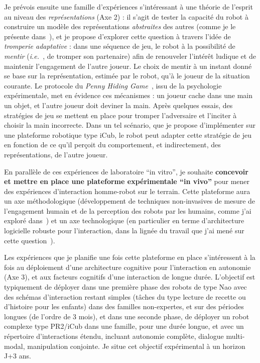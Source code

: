 \documentclass[a4paper]{article}
\newcommand{\ie}{{\textit{i.e.~}}}
\begin{document}
Je prévois ensuite une famille d'expériences s'intéressant à une théorie de
l'esprit au niveau des \emph{représentations} (Axe 2) : il s'agit de tester la
capacité du robot à construire un modèle des représentations \emph{abstraites}
des autres (comme je le présente dans~\cite{lemaignan2015mutual}), et je propose
d'explorer cette question à travers l'idée de \emph{tromperie adaptative} : dans
une séquence de jeu, le robot à la possibilité de \emph{mentir} (\ie, de tromper
son partenaire) afin de renouveler l'intérêt ludique et de maintenir
l'engagement de l'autre joueur. Le choix de mentir à un instant donné se base sur
la représentation, estimée par le robot, qu'à le joueur de la situation
courante. Le protocole du \emph{Penny Hiding Game}~\cite{oswald1989role}, issu
de la psychologie expérimentale, met en évidence ces mécanismes : un joueur
cache dans une main un objet, et l'autre joueur doit deviner la main.  Après
quelques essais, des stratégies de jeu se mettent en place pour tromper
l'adversaire et l'inciter à choisir la main incorrecte. Dans un tel scénario,
que je propose d'implémenter sur une plateforme robotique type iCub, le robot
peut adapter cette stratégie de jeu en fonction de ce qu'il perçoit du
comportement, et indirectement, des représentations, de l'autre joueur.

En parallèle de ces expériences de laboratoire ``in vitro'', je souhaite
\textbf{concevoir et mettre en place une plateforme expérimentale ``in vivo''}
pour mener des expériences d'interaction homme-robot sur le terrain. Cette
plateforme aura un axe méthodologique (développement de techniques non-invasives
de mesure de l'engagement humain et de la perception des robots par les humains,
comme j'ai exploré
dans~\cite{lemaignan2014dynamics,lemaignan2014cognitive,fink2015anthropomorphism,sharma2015measuring})
et un axe technologique (en particulier en terme d'architecture logicielle
robuste pour l'interaction, dans la lignée du travail que j'ai mené sur cette
question~\cite{lemaignan2015human,lemaignan2015pyrobots}).

Les expériences que je planifie une fois cette plateforme en place s'intéressent
à la fois au déploiement d'une architecture cognitive pour l'interaction en
autonomie (Axe 3), et aux facteurs cognitifs d'une interaction de longue durée.
L'objectif est typiquement de déployer dans une première phase des robots de
type Nao avec des schémas d'interaction restant simples (tâches du type lecture
de recette ou d'histoire pour les enfants) dans des familles non-expertes, et
sur des périodes longues (de l'ordre de 3 mois), et dans une seconde phase, de
déployer un robot complexe type PR2/iCub dans une famille, pour une durée
longue, et avec un répertoire d'interactions étendu, incluant autonomie
complète, dialogue multi-modal, manipulation conjointe. Je situe cet objectif
expérimental à un horizon J+3 ans.
\end{document}
